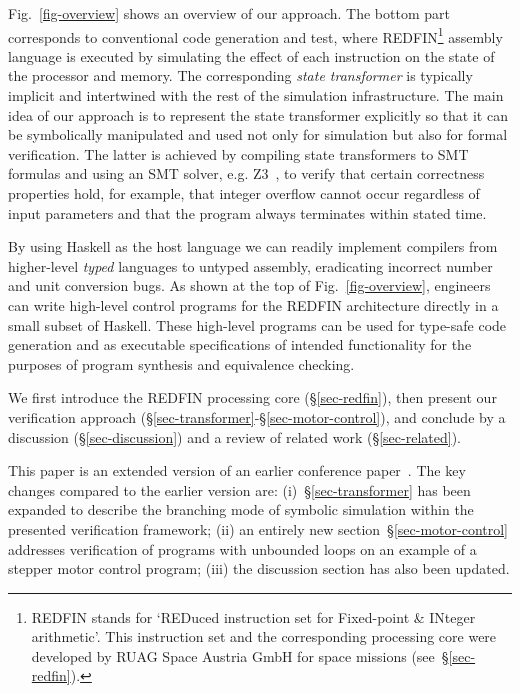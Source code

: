 Fig.~\ref{fig-overview} shows an overview of our approach. The bottom part
corresponds to conventional code generation and test, where
REDFIN\footnote{REDFIN stands for `REDuced instruction set for Fixed-point \&
INteger arithmetic'. This instruction set and the corresponding processing core
were developed by RUAG Space Austria GmbH for space missions
(see~\S\ref{sec-redfin}).} assembly language is executed by
simulating the effect of each instruction on the state of the processor and memory.
The corresponding \emph{state transformer} is typically implicit and intertwined
with the rest of the simulation infrastructure. The main idea of our approach is
to represent the state transformer explicitly so that it can be symbolically
manipulated and used not only for simulation but also for formal verification.
The latter is achieved by compiling state transformers to SMT formulas and using
an SMT solver, e.g. Z3~\cite{de2008z3}, to verify that certain correctness
properties hold, for example, that integer overflow cannot occur regardless of
input parameters and that the program always terminates within stated time.

By using Haskell as the host language we can readily implement compilers from
higher-level \emph{typed} languages to untyped assembly, eradicating incorrect
number and unit conversion bugs. As shown at the top of Fig.~\ref{fig-overview},
engineers can write high-level control programs for the REDFIN architecture
directly in a small subset of Haskell. These high-level programs can be used for
type-safe code generation and as executable specifications of intended
functionality for the purposes of program synthesis and equivalence checking.


We first introduce the REDFIN processing core (\S\ref{sec-redfin}), then
present our verification approach (\S\ref{sec-transformer}-\S\ref{sec-motor-control}),
and conclude by a discussion (\S\ref{sec-discussion}) and a review of related
work (\S\ref{sec-related}).

This paper is an extended version of an earlier conference
paper~\cite{redfin-hs-19}. The key changes compared to the earlier
version are: (i)~\S\ref{sec-transformer} has been expanded to describe
the branching mode of symbolic simulation within the presented verification
framework; (ii) an entirely new section~\S\ref{sec-motor-control} addresses
verification of programs with unbounded loops on an
example of a stepper motor control program; (iii) the discussion
section has also been updated.
